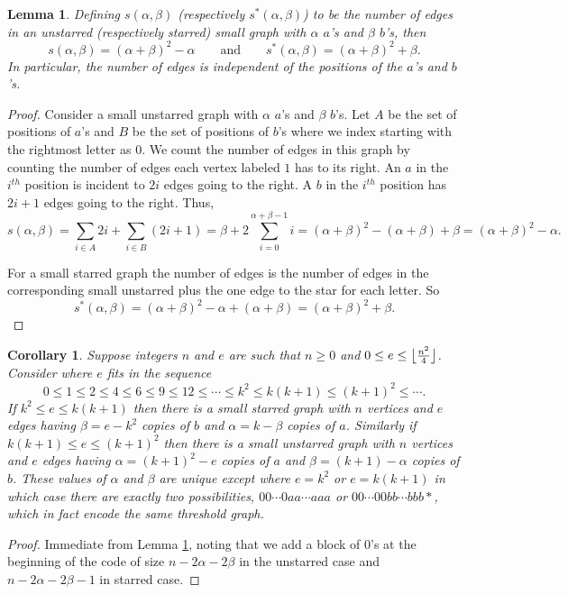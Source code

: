 \documentclass[12pt]{amsart}
\theoremstyle{plain}
\newtheorem{lem}[thm]{Lemma}
\newtheorem{cor}[thm]{Corollary}
\theoremstyle{definition}
\DeclarePairedDelimiter{\floor}{\lfloor}{\rfloor}
\begin{document}
\begin{lem}\label{lem:edgecount}
Defining $s(\alpha,\beta)$ (respectively $s^*(\alpha,\beta)$) to be the number of edges in an  unstarred (respectively starred) small graph with $\alpha$ $a$'s and $\beta$ $b$'s,  then
\[ s(\alpha,\beta) = (\alpha+\beta)^2-\alpha \qquad \text{and} \qquad s^*(\alpha,\beta) = (\alpha+\beta)^2 + \beta.\]
In particular, the number of edges is independent of the positions of the $a$'s and $b$'s.
\end{lem}
\begin{proof}
Consider a  small unstarred graph with $\alpha$ $a$'s and $\beta$ $b$'s.   Let  $A$ be the set of positions of $a$'s and $B$ be the set of positions of $b$'s where we index starting with the rightmost letter as $0$. We count the number of edges in this graph by counting the number of edges each vertex labeled $1$ has to its right.  An $a$ in the $i^{th}$ position is incident to $2i$ edges going to the right.  A $b$ in the $i^{th}$ position has $2i+1$ edges going to the right.  Thus, 
\[
s(\alpha,\beta) = \sum_{i\in A} 2i + \sum_{i\in B} (2i+1) = \beta + 2 \sum_{i=0}^{\alpha+\beta-1} i
= (\alpha+\beta)^2 -(\alpha+\beta) + \beta 
=(\alpha+\beta)^2 -\alpha.
\]

For a  small starred graph the number of edges is the number of edges in the corresponding  small unstarred plus the one edge to the star for each letter.  So
\[ s^*(\alpha,\beta) = (\alpha+\beta)^2-\alpha + (\alpha+\beta)= (\alpha+\beta)^2 + \beta.\]
\end{proof}

\begin{cor}\label{cor:codesmall}
Suppose integers $n$ and $e$ are such that $n\geq 0$ and $0\leq e \leq \floor[\big]{\frac{n^2}4}$. Consider where $e$ fits in the sequence 
\[0\le 1\le 2 \le 4 \le 6 \le 9 \le 12 \le \cdots \le k^2 \le k(k+1) \le (k+1)^2 \le \cdots .\]
If $k^2\leq e \leq k(k+1)$ then there is a small starred graph with $n$ vertices and $e$ edges having $\beta = e-k^2$ copies of $b$ and $\alpha =k-\beta$ copies of $a$. Similarly if $k(k+1)\leq e \leq (k+1)^2$ then there is a small unstarred graph with $n$ vertices and $e$ edges having $\alpha = (k+1)^2 - e$ copies of $a$ and $\beta = (k+1)-\alpha$ copies of $b$.  These values of $\alpha$ and $\beta$ are unique except where $e =k^2$ or $e=k(k+1)$ in which case there are exactly two possibilities, $00\cdots 0aa\cdots aaa$ or $00\cdots 00bb\cdots bbb*$, which in fact encode the same threshold graph.
\end{cor}
\begin{proof}
Immediate from Lemma \ref{lem:edgecount}, noting that we add a block of $0$'s at the beginning of the code of size $n-2\alpha-2\beta$ in the unstarred case and $n-2\alpha-2\beta-1$ in starred case.
\end{proof}
\end{document}

